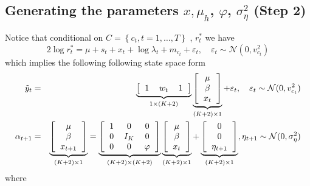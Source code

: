 \documentclass[12pt]{article}
\begin{document}
\subsection{Generating the parameters $x,\mu_{h}$, $\varphi$, $\sigma^{2}_{\eta}$ (Step 2)} 
Notice that conditional on $C=\left\{c_{t}, t=1, \ldots, T  \right\}$ , $r^{*}_{t}$ we have 
\begin{equation}
2 \log r^{*}_{t}  = \mu+s_t+x_t +\log \lambda_t+ m_{ c_{t}}+\varepsilon_{t} , \quad \varepsilon_{t} \sim \mathcal{N}(0, v^{2}_{c_{t}})
\end{equation}
which implies the following following state space form
\begin{eqnarray}
\tilde{y}_t &=&  \underbrace{\left[ 
\begin{tabular}{ccc}
1 &$w_t$ &1 
\end{tabular}
\right]}_{1 \times (K+2)}  \underbrace{\left[ 
\begin{tabular}{c}
$\mu$ \\
$\beta $ \\
$x_{t}$
\end{tabular}
\right]}_{(K+2)\times 1}  +\varepsilon_{t} , \quad \varepsilon_{t} \sim \mathcal{N}(0, v^{2}_{c_{t}}) \label{c_eq:tssf1}\\ 
\alpha_{t+1}  &=& \underbrace{\left[ 
\begin{tabular}{c}
$\mu$ \\
$\beta $ \\
$x_{t+1}$
\end{tabular}
\right]}_{(K+2)\times 1} = \underbrace{\left[ 
\begin{tabular}{ccc}
1 &0& 0 \\
0& $I_{K}$ & 0 \\
0 &0& $\varphi$
\end{tabular}
\right]}_{(K+2)\times(K+2)} 
\underbrace{\left[ 
\begin{tabular}{c}
$\mu$ \\
$\beta $ \\
$x_{t}$
\end{tabular}
\right]}_{(K+2)\times 1} +\underbrace{\left[ 
\begin{tabular}{c}
0 \\
0 \\
$\eta_{t+1}$
\end{tabular}
\right]}_{(K+2)\times 1}  ,  \eta_{t+1} \sim \mathcal{N}(0,\sigma^{2}_{\eta}) \label{c_eq:tssf2} 
\end{eqnarray}
where 
\end{document}
